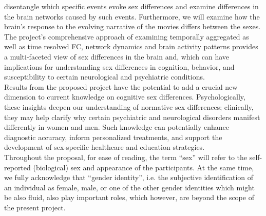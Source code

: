 \documentclass[11pt,a4paper]{article}
\begin{document}
disentangle which specific events evoke sex differences and examine differences in the brain networks caused by 
such events. Furthermore, we will examine how the brain’s response to the evolving narrative of the movies differs 
between the sexes. The project's comprehensive approach of examining temporally aggregated as well as time resolved FC, 
network dynamics and brain activity patterns provides a multi-faceted view of sex differences in the brain and, 
which can have implications for understanding sex differences in cognition, behavior, and susceptibility to certain 
neurological and psychiatric conditions.\\
Results from the proposed project have the potential to add a crucial new dimension to current knowledge on 
cognitive sex differences. Psychologically, these insights deepen our understanding of normative sex differences; 
clinically, they may help clarify why certain psychiatric and neurological disorders manifest differently in women 
and men. Such knowledge can potentially enhance diagnostic accuracy, inform personalized treatments, and support the 
development of sex-specific healthcare and education strategies.\\
Throughout the proposal, for ease of reading, the term “sex” will refer to the self-reported (biological) sex and 
appearance of the participants. At the same time, we fully acknowledge that “gender identity”, i.e. the 
subjective identification of an individual as female, male, or one of the other gender identities which might 
be also fluid, also play important roles, which however, are beyond the scope of the present project. 
\end{document}
